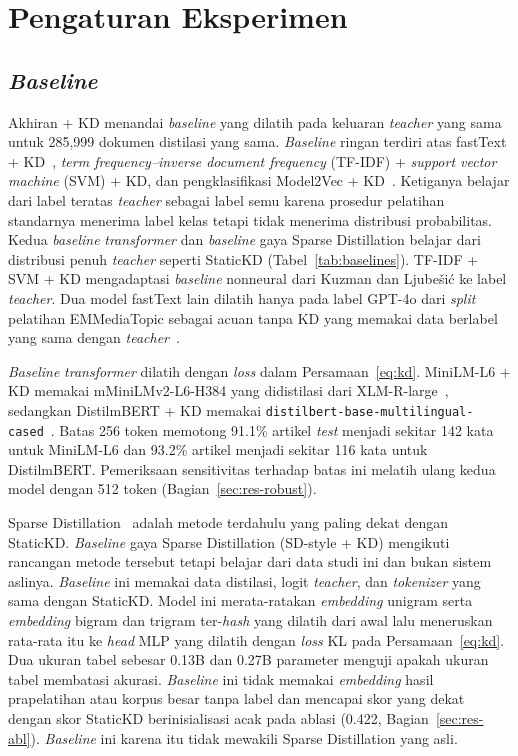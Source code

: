 \documentclass{ieeeaccess}
\newcommand{\en}[1]{\textit{#1}}
\begin{document}
\section{Pengaturan Eksperimen}
\label{sec:setup}
\subsection{\en{Baseline}}
\label{sec:baselines}
Akhiran + KD menandai \en{baseline} yang dilatih pada keluaran \en{teacher} yang sama untuk 285,999 dokumen distilasi yang sama. \en{Baseline} ringan terdiri atas fastText + KD~\cite{joulin2017bag}, \en{term frequency--inverse document frequency} (TF-IDF) + \en{support vector machine} (SVM) + KD, dan pengklasifikasi Model2Vec + KD~\cite{tulkens2024model2vec}. Ketiganya belajar dari label teratas \en{teacher} sebagai label semu karena prosedur pelatihan standarnya menerima label kelas tetapi tidak menerima distribusi probabilitas. Kedua \en{baseline} \en{transformer} dan \en{baseline} gaya Sparse Distillation belajar dari distribusi penuh \en{teacher} seperti StaticKD (Tabel~\ref{tab:baselines}). TF-IDF + SVM + KD mengadaptasi \en{baseline} nonneural dari Kuzman dan Ljube\v{s}i\'c ke label \en{teacher}. Dua model fastText lain dilatih hanya pada label GPT-4o dari \en{split} pelatihan EMMediaTopic sebagai acuan tanpa KD yang memakai data berlabel yang sama dengan \en{teacher}~\cite{kuzman2025llm}.

\en{Baseline} \en{transformer} dilatih dengan \en{loss} dalam Persamaan~\eqref{eq:kd}. MiniLM-L6 + KD memakai mMiniLMv2-L6-H384 yang didistilasi dari XLM-R-large~\cite{wang2021minilmv2}, sedangkan DistilmBERT + KD memakai \texttt{distilbert-base-multilingual-cased}~\cite{sanh2019distilbert}. Batas 256 token memotong 91.1\% artikel \en{test} menjadi sekitar 142 kata untuk MiniLM-L6 dan 93.2\% artikel menjadi sekitar 116 kata untuk DistilmBERT. Pemeriksaan sensitivitas terhadap batas ini melatih ulang kedua model dengan 512 token (Bagian~\ref{sec:res-robust}).

Sparse Distillation~\cite{ye2022sparse} adalah metode terdahulu yang paling dekat dengan StaticKD. \en{Baseline} gaya Sparse Distillation (SD-style + KD) mengikuti rancangan metode tersebut tetapi belajar dari data studi ini dan bukan sistem aslinya. \en{Baseline} ini memakai data distilasi, logit \en{teacher}, dan \en{tokenizer} yang sama dengan StaticKD. Model ini merata-ratakan \en{embedding} unigram serta \en{embedding} bigram dan trigram ter-\en{hash} yang dilatih dari awal lalu meneruskan rata-rata itu ke \en{head} MLP yang dilatih dengan \en{loss} KL pada Persamaan~\eqref{eq:kd}. Dua ukuran tabel sebesar 0.13B dan 0.27B parameter menguji apakah ukuran tabel membatasi akurasi. \en{Baseline} ini tidak memakai \en{embedding} hasil prapelatihan atau korpus besar tanpa label dan mencapai skor yang dekat dengan skor StaticKD berinisialisasi acak pada ablasi (0.422, Bagian~\ref{sec:res-abl}). \en{Baseline} ini karena itu tidak mewakili Sparse Distillation yang asli.
\end{document}
